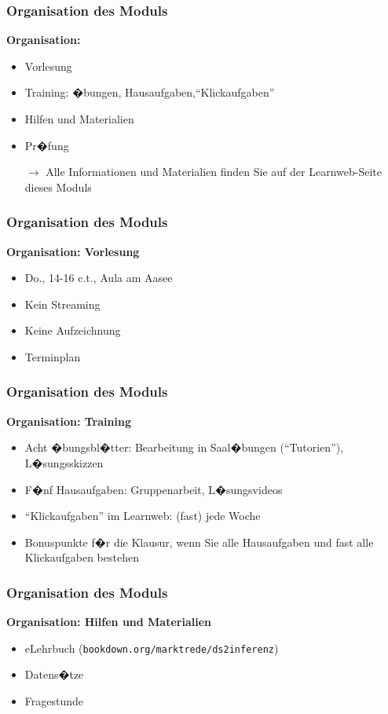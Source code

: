 \documentclass[12pt,show notes]{beamer}
\begin{document}
\begin{frame}
\frametitle{Organisation des Moduls}
\textbf{Organisation:}\medskip
\begin{itemize}
\item Vorlesung
\item Training: �bungen, Hausaufgaben,``Klickaufgaben''
\item Hilfen und Materialien
\item Pr�fung\bigskip\pause
\item[$\longrightarrow$]
Alle Informationen und Materialien finden Sie auf der Learnweb-Seite
dieses Moduls
\end{itemize}
\end{frame}

\begin{frame}
\frametitle{Organisation des Moduls}
\textbf{Organisation: Vorlesung}\medskip
\begin{itemize}
\item Do., 14-16 c.t., Aula am Aasee
\item Kein Streaming
\item Keine Aufzeichnung
\item Terminplan
\end{itemize}
\end{frame}

\begin{frame}
\frametitle{Organisation des Moduls}
\textbf{Organisation: Training}\medskip
\begin{itemize}
\item Acht �bungsbl�tter: Bearbeitung in Saal�bungen (``Tutorien''), L�sungsskizzen
\item F�nf Hausaufgaben: Gruppenarbeit, L�sungsvideos
\item ``Klickaufgaben'' im Learnweb: (fast) jede Woche
\item Bonuspunkte f�r die Klausur, wenn Sie
alle Hausaufgaben und fast alle Klickaufgaben bestehen
\end{itemize}
\end{frame}

\begin{frame}
\frametitle{Organisation des Moduls}
\textbf{Organisation: Hilfen und Materialien}\medskip
\begin{itemize}
\item eLehrbuch (\texttt{bookdown.org/marktrede/ds2inferenz})
\item Datens�tze
\item Fragestunde 
\end{itemize}
\end{frame}
\end{document}
